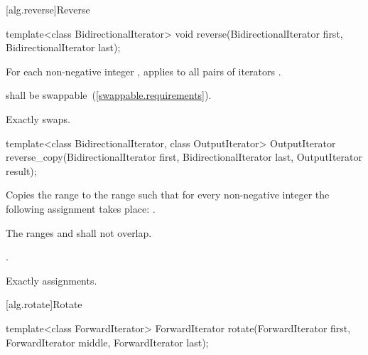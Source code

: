 [alg.reverse]{Reverse}

%
\begin{itemdecl}
template<class BidirectionalIterator>
  void reverse(BidirectionalIterator first, BidirectionalIterator last);
\end{itemdecl}

\begin{itemdescr}
\pnum
\effects
For each non-negative integer
,
applies
to all pairs of iterators
.

\pnum
\requires
{} shall be swappable~(\ref{swappable.requirements}).

\pnum
\complexity
Exactly
swaps.
\end{itemdescr}

%
\begin{itemdecl}
template<class BidirectionalIterator, class OutputIterator>
  OutputIterator
    reverse_copy(BidirectionalIterator first,
                 BidirectionalIterator last, OutputIterator result);
\end{itemdecl}

\begin{itemdescr}
\pnum
\effects
Copies the range
to the range
such that
for every non-negative integer
the following assignment takes place:
.

\pnum
\requires
The ranges
and
shall not overlap.

\pnum
\returns
{}.

\pnum
\complexity
Exactly
assignments.
\end{itemdescr}

[alg.rotate]{Rotate}

%
\begin{itemdecl}
template<class ForwardIterator>
  ForwardIterator rotate(ForwardIterator first, ForwardIterator middle,
              ForwardIterator last);
\end{itemdecl}

